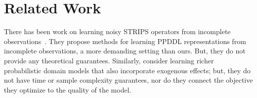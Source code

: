 \documentclass[letterpaper]{article} %
\begin{document}
%
% 
%
%
%
%
%
%
%
%


\section{Related Work}


There has been work on learning noisy STRIPS operators from incomplete observations~\cite{pasula2007learning,mourao2012learning,rodrigues2011incremental,ng2019incremental}. They propose methods for learning PPDDL representations from incomplete observations, a more demanding setting than ours. But, they do not provide any theoretical guarantees. Similarly, \citet{martinez2017relational} consider learning richer probabilistic domain models that also incorporate exogenous effects; but, they do not have time or sample complexity guarantees, nor do they connect the objective they optimize to the quality of the model.

\end{document}
